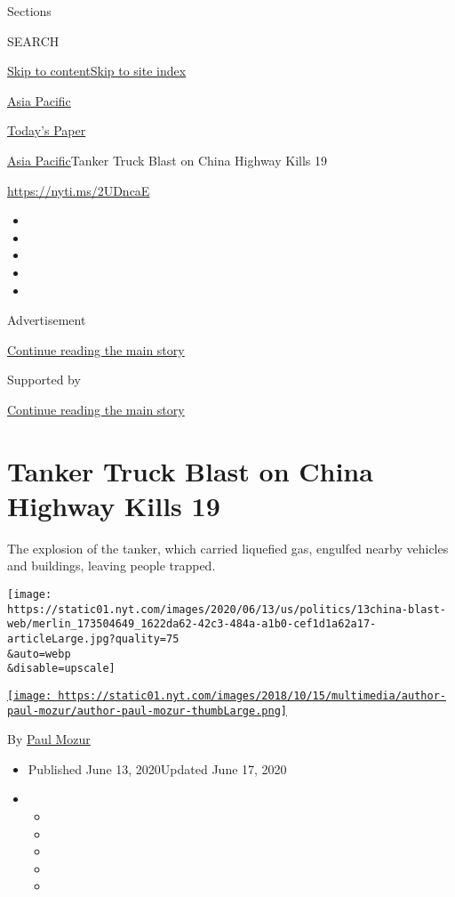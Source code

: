 Sections

SEARCH

\protect\hyperlink{site-content}{Skip to
content}\protect\hyperlink{site-index}{Skip to site index}

\href{https://www.nytimes.com/section/world/asia}{Asia Pacific}

\href{https://myaccount.nytimes.com/auth/login?response_type=cookie\&client_id=vi}{}

\href{https://www.nytimes.com/section/todayspaper}{Today's Paper}

\href{/section/world/asia}{Asia Pacific}\textbar{}Tanker Truck Blast on
China Highway Kills 19

\url{https://nyti.ms/2UDncaE}

\begin{itemize}
\item
\item
\item
\item
\item
\end{itemize}

Advertisement

\protect\hyperlink{after-top}{Continue reading the main story}

Supported by

\protect\hyperlink{after-sponsor}{Continue reading the main story}

\hypertarget{tanker-truck-blast-on-china-highway-kills-19}{%
\section{Tanker Truck Blast on China Highway Kills
19}\label{tanker-truck-blast-on-china-highway-kills-19}}

The explosion of the tanker, which carried liquefied gas, engulfed
nearby vehicles and buildings, leaving people trapped.

\texttt{[image: https://static01.nyt.com/images/2020/06/13/us/politics/13china-blast-web/merlin\_173504649\_1622da62-42c3-484a-a1b0-cef1d1a62a17-articleLarge.jpg?quality=75\\\&auto=webp\\\&disable=upscale]}

\href{https://www.nytimes.com/by/paul-mozur}{\texttt{[image: https://static01.nyt.com/images/2018/10/15/multimedia/author-paul-mozur/author-paul-mozur-thumbLarge.png]}}

By \href{https://www.nytimes.com/by/paul-mozur}{Paul Mozur}

\begin{itemize}
\item
  Published June 13, 2020Updated June 17, 2020
\item
  \begin{itemize}
  \item
  \item
  \item
  \item
  \item
  \end{itemize}
\end{itemize}

